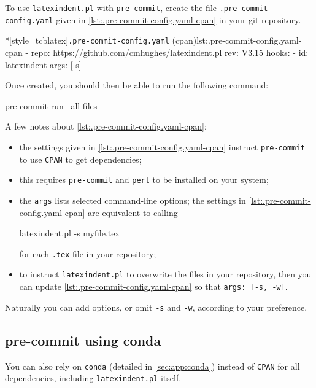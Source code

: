 		To use \texttt{latexindent.pl} with \texttt{pre-commit}, create the file
		\texttt{.pre-commit-config.yaml} given in \cref{lst:.pre-commit-config.yaml-cpan} in your
		git-repository.
		\begin{cmhlistings}*[style=tcblatex]{\texttt{.pre-commit-config.yaml} (cpan)}{lst:.pre-commit-config.yaml-cpan}
- repo: https://github.com/cmhughes/latexindent.pl
  rev: V3.15
  hooks:
  - id: latexindent
    args: [-s]
\end{cmhlistings}
		Once created, you should then be able to run the following command:
		\begin{commandshell}
pre-commit run --all-files  
\end{commandshell}
		A few notes about \cref{lst:.pre-commit-config.yaml-cpan}:
		\begin{itemize}
			\item the settings given in \cref{lst:.pre-commit-config.yaml-cpan} instruct
			      \texttt{pre-commit} to use \texttt{CPAN} to get dependencies;
			\item this requires \texttt{pre-commit} and \texttt{perl} to be installed on your system;
			\item the \texttt{args} lists selected command-line options; the settings in
			      \cref{lst:.pre-commit-config.yaml-cpan} are equivalent to calling
			      \begin{commandshell}
latexindent.pl -s myfile.tex       
\end{commandshell}
			      for each \texttt{.tex} file in your repository;
			\item to instruct \texttt{latexindent.pl} to overwrite the files in your repository, then you
			      can update \cref{lst:.pre-commit-config.yaml-cpan} so that \texttt{args: [-s, -w]}.
		\end{itemize}

		Naturally you can add options, or omit \texttt{-s} and \texttt{-w}, according to your
		preference.

	\subsection{pre-commit using conda}\label{sec:pre-commit-conda}

		You can also rely on \texttt{conda} (detailed in \cref{sec:app:conda}) instead of
		\texttt{CPAN} for all dependencies, including \texttt{latexindent.pl} itself.

